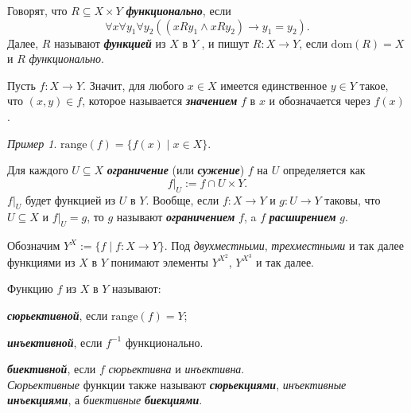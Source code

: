 \documentclass{article}
\newcommand{\range}{\mathrm{range}}
\newcommand{\dom}{\mathrm{dom}}
\theoremstyle{remark}
\newtheorem{example}{Пример}
\begin{document}
\begin{definition}
	Говорят, что $R \subseteq X \times Y$ \textbf{\textit{функционально}}, если
	$$\forall x \forall y_1 \forall y_2 ((xRy_1 \wedge xRy_2) \rightarrow y_1 = y_2).$$
	Далее, $R$ называют \textbf{\textit{функцией}} из $X$ в $Y$ , и пишут $R : X \rightarrow Y$, если $\dom(R) = X$ и $R$ \textit{функционально}.
\end{definition}

\begin{definition}
	Пусть $f : X \rightarrow Y$. Значит, для любого $x \in X$ имеется единственное $y \in Y$ такое, что $(x , y) \in f$, которое называется \textbf{\textit{значением}} $f$ в $ x $ и обозначается через $ f (x) $. 
\end{definition}

\begin{example}
	$\range(f) = \{f(x)\mid x\in X\}.$
\end{example}


\begin{definition}
	Для каждого $U \subseteq X$ \textbf{\textit{ограничение}} (или \textit{\textbf{сужение}}) $f$ на $U$ определяется как
	$$f|_U := f \cap U \times Y.$$
	$f|_U$ будет функцией из $U$ в $Y$. Вообще, если $ f : X \rightarrow Y$ и $g : U \rightarrow Y $ таковы, что $ U \subseteq X  $ и $ f|_U= g $, то $g$ называют \textit{\textbf{ограничением}} $ f $, a $ f $ \textit{\textbf{расширением}} $ g $. 
\end{definition}

\begin{definition}
	Обозначим $Y^X :=\{f\mid f:X\rightarrow Y\}.$
Под \textit{двухместными}, \textit{трехместными} и так далее функциями из $X$ в $Y$ понимают элементы $Y^{X^2}$, $Y^{X^3}$ и так далее.
\end{definition}

\begin{definition}
	Функцию $f$ из $X$ в $Y$ называют:
	
	\textbf{\textit{сюрьективной}}, если $\range (f) = Y$;
	
	\textbf{\textit{инъективной}}, если $f^{-1}$ функционально. 
	
	\textbf{\textit{биективной}}, если $ f $ \textit{сюрьективна} и \textit{инъективна}.\\
	\textit{Сюрьективные} функции также называют \textbf{\textit{сюрьекциями}}, \textit{инъективные} \textbf{\textit{инъекциями}}, а \textit{биективные} \textbf{\textit{биекциями}}.
\end{definition}
\end{document}
